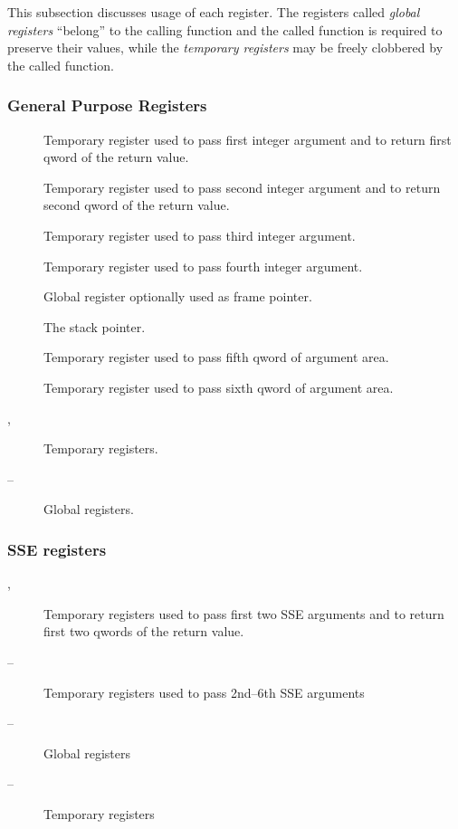 This subsection discusses usage of each register.  The registers called
\emph{global registers} ``belong'' to the calling function and the called function
is required to preserve their values, while the \emph{temporary registers} may
be freely clobbered by the called function.

\subsubsection {General Purpose Registers}

\begin{description}
  \item [\RAX]
    Temporary register used to pass first integer argument and to return
    first qword of the return value.
  \item [\RDX]
    Temporary register used to pass second integer argument
    and to return second qword of the return value.
  \item [\RCX] Temporary register used to pass third integer argument.
  \item [\RBX] Temporary register used to pass fourth integer argument.
  \item [\RBP] Global register optionally used as frame pointer.
  \item [\RSP] The stack pointer.
  \item [\RSI]
    Temporary register used to pass fifth qword of argument area.
  \item [\RDI] 
    Temporary register used to pass sixth qword of argument area.
  \item [, ] Temporary registers.
  \item [ -- ] Global registers.
\end{description}

\subsubsection {SSE registers}

\begin{description}
  \item [, ] Temporary registers used to pass first two SSE arguments
    and to return first two qwords of the return value.
  \item [ -- ] Temporary registers used to pass 2nd--6th SSE arguments
  \item [ -- ] Global registers
  \item [ -- ] Temporary registers
\end{description}

